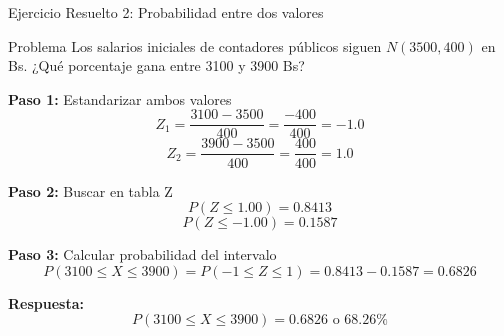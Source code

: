 \documentclass[10pt]{beamer}
\begin{document}
\begin{frame}{Ejercicio Resuelto 2: Probabilidad entre dos valores}
\begin{exampleblock}{Problema}
Los salarios iniciales de contadores públicos siguen $N(3500, 400)$ en Bs. ¿Qué porcentaje gana entre 3100 y 3900 Bs?
\end{exampleblock}

\vspace{0.2cm}
\begin{block}{\textbf{Paso 1:} Estandarizar ambos valores}
$$Z_1 = \frac{3100 - 3500}{400} = \frac{-400}{400} = -1.0$$
$$Z_2 = \frac{3900 - 3500}{400} = \frac{400}{400} = 1.0$$
\end{block}

\begin{block}{\textbf{Paso 2:} Buscar en tabla Z}
$$P(Z \leq 1.00) = 0.8413$$
$$P(Z \leq -1.00) = 0.1587$$
\end{block}

\begin{block}{\textbf{Paso 3:} Calcular probabilidad del intervalo}
$$P(3100 \leq X \leq 3900) = P(-1 \leq Z \leq 1) = 0.8413 - 0.1587 = 0.6826$$
\end{block}

\begin{exampleblock}{\textbf{Respuesta:}}
$$\boxed{P(3100 \leq X \leq 3900) = 0.6826 \text{ o } 68.26\%}$$
\end{exampleblock}
\end{frame}
\end{document}

